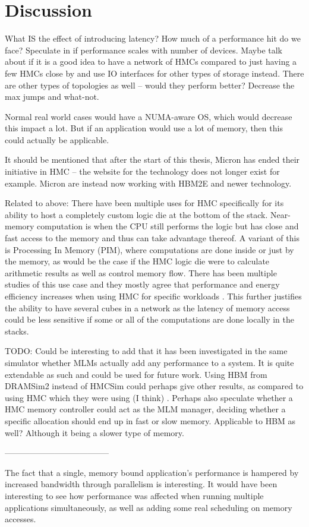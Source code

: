 \chapter{Discussion}
What IS the effect of introducing latency? How much of a performance hit do we face? Speculate in if performance scales with number of devices. Maybe talk about if it is a good idea to have a network of HMCs compared to just having a few HMCs close by and use IO interfaces for other types of storage instead. There are other types of topologies as well -- would they perform better? Decrease the max jumps and what-not.

Normal real world cases would have a NUMA-aware OS, which would decrease this impact a lot. But if an application would use a lot of memory, then this could actually be applicable. 

It should be mentioned that after the start of this thesis, Micron has ended their initiative in HMC -- the website for the technology does not longer exist for example. Micron are instead now working with HBM2E and newer technology. 

Related to above: There have been multiple uses for HMC specifically for its ability to host a completely custom logic die at the bottom of the stack. Near-memory computation is when the CPU still performs the logic but has close and fast access to the memory and thus can take advantage thereof. A variant of this is Processing In Memory (PIM), where computations are done inside or just by the memory, as would be the case if the HMC logic die were to calculate arithmetic results as well as control memory flow. There has been multiple studies of this use case and they mostly agree that performance and energy efficiency increases when using HMC for specific workloads \cite{7917248} \cite{Min:2019:NEH:3287624.3287642} \cite{7804052} \cite{oliveira2017nim}. This further justifies the ability to have several cubes in a network as the latency of memory access could be less sensitive if some or all of the computations are done locally in the stacks.

TODO: Could be interesting to add that it has been investigated in the same simulator whether MLMs actually add any performance to a system. It is quite extendable as such and could be used for future work. Using HBM from DRAMSim2 instead of HMCSim could perhaps give other results, as compared to using HMC which they were using (I think) \cite{Awad:2017:PAU:3132402.3132422}. Perhaps also speculate whether a HMC memory controller could act as the MLM manager, deciding whether a specific allocation should end up in fast or slow memory. Applicable to HBM as well? Although it being a slower type of memory.

--------------------------------------

The fact that a single, memory bound application's performance is hampered by increased bandwidth through parallelism is interesting. It would have been interesting to see how performance was affected when running multiple applications simultaneously, as well as adding some real scheduling on memory accesses.